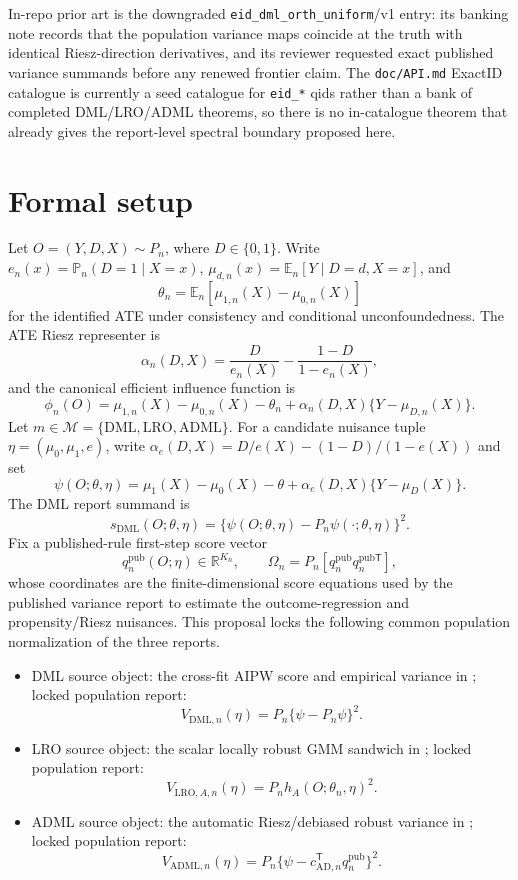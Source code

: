\documentclass[11pt]{article}
\newcommand{\E}{\mathbb{E}}
\renewcommand{\Pr}{\mathbb{P}}
\newcommand{\transpose}{\mathsf{T}}
\newcommand{\R}{\mathbb{R}}
\theoremstyle{definition}
\theoremstyle{plain}
\theoremstyle{remark}
\begin{document}
In-repo prior art is the downgraded \texttt{eid\_dml\_orth\_uniform}/v1 entry:
its banking note records that the population variance maps coincide at the
truth with identical Riesz-direction derivatives, and its reviewer requested
exact published variance summands before any renewed frontier claim.  The
\texttt{doc/API.md} ExactID catalogue is currently a seed catalogue for
\texttt{eid\_*} qids rather than a bank of completed DML/LRO/ADML theorems, so
there is no in-catalogue theorem that already gives the report-level spectral
boundary proposed here.

\section{Formal setup}
Let \(O=(Y,D,X)\sim P_n\), where \(D\in\{0,1\}\).  Write
\(e_n(x)=\Pr_n(D=1\mid X=x)\), \(\mu_{d,n}(x)=\E_n[Y\mid D=d,X=x]\), and
\[
\theta_n=\E_n[\mu_{1,n}(X)-\mu_{0,n}(X)]
\]
for the identified ATE under consistency and conditional unconfoundedness.
The ATE Riesz representer is
\[
\alpha_n(D,X)=\frac{D}{e_n(X)}-\frac{1-D}{1-e_n(X)},
\]
and the canonical efficient influence function is
\[
\phi_n(O)=\mu_{1,n}(X)-\mu_{0,n}(X)-\theta_n
          +\alpha_n(D,X)\{Y-\mu_{D,n}(X)\}.
\]
Let \(m\in\mathcal M=\{\mathrm{DML},\mathrm{LRO},\mathrm{ADML}\}\).  For a
candidate nuisance tuple \(\eta=(\mu_0,\mu_1,e)\), write
\(\alpha_e(D,X)=D/e(X)-(1-D)/(1-e(X))\) and set
\[
\psi(O;\theta,\eta)=\mu_1(X)-\mu_0(X)-\theta+\alpha_e(D,X)\{Y-\mu_D(X)\}.
\]
The DML report summand is
\[
s_{\mathrm{DML}}(O;\theta,\eta)
  =\{\psi(O;\theta,\eta)-P_n\psi(\cdot;\theta,\eta)\}^2.
\]
Fix a published-rule first-step score vector
\[
q^{\mathrm{pub}}_n(O;\eta)\in\R^{K_n},\qquad
\Omega_n=P_n[q^{\mathrm{pub}}_n q^{\mathrm{pub}\transpose}_n],
\]
whose coordinates are the finite-dimensional score equations used by the
published variance report to estimate the outcome-regression and
propensity/Riesz nuisances.  This proposal locks the following common
population normalization of the three reports.
\begin{itemize}[leftmargin=*]
\item DML source object: the cross-fit AIPW score and empirical variance in
\citet{ChernozhukovEtAl2018ECTJ}; locked population report:
\[
V_{\mathrm{DML},n}(\eta)=P_n\{\psi-P_n\psi\}^2.
\]
\item LRO source object: the scalar locally robust GMM sandwich in
\citet{ChernozhukovEscancianoIchimuraNeweyRobins2022LRO}; locked population
report:
\[
V_{\mathrm{LRO},A,n}(\eta)=P_n h_A(O;\theta_n,\eta)^2.
\]
\item ADML source object: the automatic Riesz/debiased robust variance in
\citet{ChernozhukovNeweySingh2022ADML}; locked population report:
\[
V_{\mathrm{ADML},n}(\eta)=P_n\{\psi-c_{\mathrm{AD},n}^{\transpose}
q^{\mathrm{pub}}_n\}^2.
\]
\end{itemize}
\end{document}
